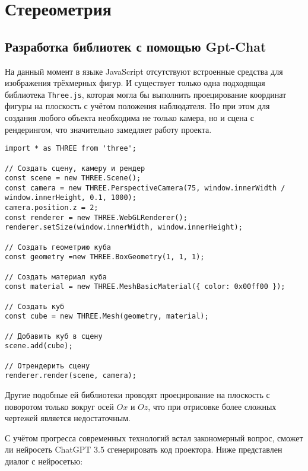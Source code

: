 \section{Стереометрия}\label{2sect}
\subsection{Разработка библиотек с помощью Gpt-Chat}

На данный момент в языке JavaScript отсутствуют встроенные средства для изображения трёхмерных фигур. И существует только одна подходящая библиотека \texttt{Three.js}, которая могла бы выполнить проецирование координат фигуры на плоскость с учётом положения наблюдателя. Но при этом для создания любого объекта необходима не только камера, но и сцена с рендерингом, что значительно замедляет работу проекта.

\begin{lstlisting}[caption={Код, необходыимый для отрисовки куба}]
import * as THREE from 'three';

// Создать сцену, камеру и рендер
const scene = new THREE.Scene();
const camera = new THREE.PerspectiveCamera(75, window.innerWidth / window.innerHeight, 0.1, 1000);
camera.position.z = 2;
const renderer = new THREE.WebGLRenderer();
renderer.setSize(window.innerWidth, window.innerHeight);

// Создать геометрию куба
const geometry =new THREE.BoxGeometry(1, 1, 1);

// Создать материал куба
const material = new THREE.MeshBasicMaterial({ color: 0x00ff00 });

// Создать куб
const cube = new THREE.Mesh(geometry, material);

// Добавить куб в сцену
scene.add(cube);

// Отрендерить сцену
renderer.render(scene, camera);

\end{lstlisting}


Другие подобные ей библиотеки проводят проецирование на плоскость с поворотом только вокруг осей $Ox$ и $Oz$, что при отрисовке более сложных чертежей является недостаточным.

С учётом прогресса современных технологий встал закономерный вопрос, сможет ли нейросеть ChatGPT 3.5 сгенерировать код проектора. Ниже представлен диалог с нейросетью:

